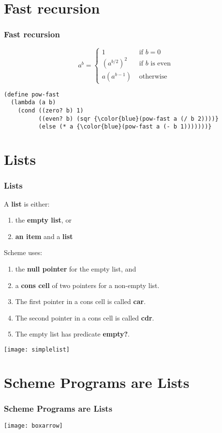 \documentclass{beamer}
\newcommand{\sect}[1]{
\section{#1}
\begin{frame}[fragile]\frametitle{#1}
}
\begin{document}
\sect{Fast recursion}
\[
a^b = \left\{\begin{array}{ll}
1 & \mbox{ if $b=0$}\\
(a^{b/2})^2 & \mbox{ if $b$ is even}\\
a(a^{b-1}) & \mbox{ otherwise}
\end{array}\right.
\]
\vfill

\begin{Verbatim}[commandchars=\\\{\}]
(define pow-fast
  (lambda (a b)
    (cond ((zero? b) 1)
          ((even? b) (sqr {\color{blue}(pow-fast a (/ b 2))))}
          (else (* a {\color{blue}(pow-fast a (- b 1)))))))}
\end{Verbatim}
\end{frame}


\sect{Lists}

A {\bf list} is either:
\begin{enumerate}
\item the {\bf empty list}, or
\item {\bf an item} and a {\bf list}
\end{enumerate}

\vfill\pause

Scheme uses:
\begin{enumerate}
\item the {\bf null pointer} for the empty list, and
\item a {\bf cons cell} of two pointers for a non-empty list.
\item The first pointer in a cons cell is called {\bf car}.
\item The second pointer in a cons cell is called {\bf cdr}.
\item The empty list has predicate {\bf empty?}.
\end{enumerate}

\texttt{[image: simplelist]}

\end{frame}
\sect{Scheme Programs are Lists}


\texttt{[image: boxarrow]}


\end{frame}
\end{document}
